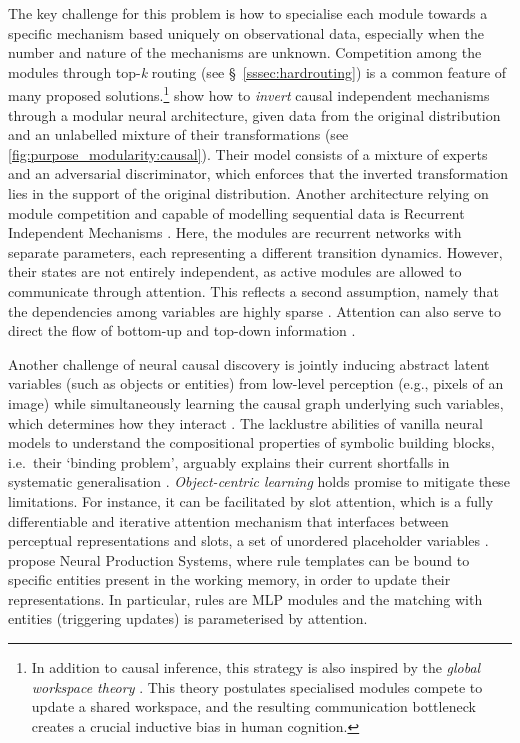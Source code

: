 \documentclass[10pt]{article} %
\begin{document}
The key challenge for this problem is how to specialise each module towards a specific mechanism based uniquely on observational data, especially when the number and nature of the mechanisms are unknown. Competition among the modules through top-\textit{k} routing (see \S~\ref{sssec:hardrouting}) is a common feature of many proposed solutions.\footnote{In addition to causal inference, this strategy is also inspired by the \textit{global workspace theory} \citep{baars2005global}. This theory postulates specialised modules compete to update a shared workspace, and the resulting communication bottleneck creates a crucial inductive bias in human cognition.}
\citet{parascandolo2018learning} show how to \textit{invert} causal independent mechanisms through a modular neural architecture, given data from the original distribution and an unlabelled mixture of their transformations (see \cref{fig:purpose_modularity:causal}). Their model consists of a mixture of experts and an adversarial discriminator, which enforces that the inverted transformation lies in the support of the original distribution. Another architecture relying on module competition and capable of modelling sequential data is Recurrent Independent Mechanisms \citep[RIMs;][]{goyal2019recurrent}. Here, the modules are recurrent networks with separate parameters, each representing a different transition dynamics. However, their states are not entirely independent, as active modules are allowed to communicate through attention. This reflects a second assumption, namely that the dependencies among variables are highly sparse \citep{mittal2022is}. Attention can also serve to direct the flow of bottom-up and top-down information \citep{pmlr-v119-mittal20a}.

Another challenge of neural causal discovery is jointly inducing abstract latent variables (such as objects or entities) from low-level perception (e.g., pixels of an image) while simultaneously learning the causal graph underlying such variables, which determines how they interact \citep{ke2021systematic}. The lacklustre abilities of vanilla neural models to understand the compositional properties of symbolic building blocks, i.e.\ their `binding problem', arguably explains their current shortfalls in systematic generalisation \citep{greff2020binding}. \textit{Object-centric learning} holds promise to mitigate these limitations. For instance, it can be facilitated by slot attention, which is a fully differentiable and iterative attention mechanism that interfaces between perceptual representations and slots, a set of unordered placeholder variables \citep{NEURIPS2020_8511df98}.
\citep{goyal2021nps} propose Neural Production Systems, where rule templates can be bound to specific entities present in the working memory, in order to update their representations. In particular, rules are MLP modules and the matching with entities (triggering updates) is parameterised by attention.
\end{document}
